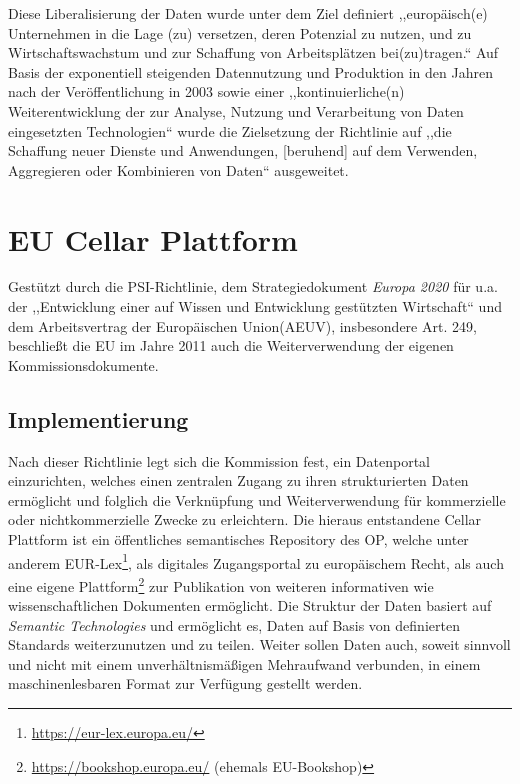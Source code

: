     \medskip
    Diese Liberalisierung der Daten wurde unter dem Ziel definiert ,,europäisch(e) Unternehmen in die Lage (zu) versetzen, deren Potenzial zu nutzen, und zu Wirtschaftswachstum und zur Schaffung von Arbeitsplätzen bei(zu)tragen.``\cite[ErwG. 5]{2003L0098} 
    Auf Basis der exponentiell steigenden Datennutzung und Produktion in den Jahren nach der Veröffentlichung in 2003 sowie einer ,,kontinuierliche(n) Weiterentwicklung der zur Analyse, Nutzung und Verarbeitung von Daten eingesetzten Technologien``\cite[ErwG. 5]{2013L0037} wurde die Zielsetzung der Richtlinie auf ,,die Schaffung neuer Dienste und Anwendungen, [beruhend] auf dem Verwenden, Aggregieren oder Kombinieren von Daten``\cite[ErwG. 5]{2013L0037} ausgeweitet. 
    
\pagebreak
\section{EU Cellar Plattform}

    Gestützt durch die PSI-Richtlinie, dem Strategiedokument \textit{Europa 2020} für u.a. der ,,Entwicklung einer auf Wissen und Entwicklung gestützten Wirtschaft`` und dem Arbeitsvertrag der Europäischen Union(AEUV), insbesondere Art. 249, beschließt die EU im Jahre 2011 auch die Weiterverwendung der eigenen Kommissionsdokumente. \cite[ErwG. 1]{2011D0833}
    
\subsection{Implementierung}

    Nach dieser Richtlinie legt sich die Kommission fest, ein Datenportal einzurichten, welches einen zentralen Zugang zu ihren strukturierten Daten ermöglicht und folglich die Verknüpfung und Weiterverwendung für kommerzielle oder nichtkommerzielle Zwecke zu erleichtern. \cite[Art. 5]{2011D0833}
    Die hieraus entstandene Cellar Plattform ist ein öffentliches semantisches Repository des \ac{OP}, welche unter anderem EUR-Lex\footnote{\href{https://eur-lex.europa.eu/homepage.html?locale=de}{https://eur-lex.europa.eu/}}, als digitales Zugangsportal zu europäischem Recht, als auch eine eigene Plattform\footnote{\href{https://bookshop.europa.eu/}{https://bookshop.europa.eu/} (ehemals EU-Bookshop)} zur Publikation von weiteren informativen wie wissenschaftlichen Dokumenten ermöglicht.
    Die Struktur der Daten basiert auf \textit{Semantic Technologies} und ermöglicht es, Daten auf Basis von definierten Standards weiterzunutzen und zu teilen. \cite[5]{eu_cellar}
    Weiter sollen Daten auch, soweit sinnvoll und nicht mit einem unverhältnismäßigen Mehraufwand verbunden, in einem maschinenlesbaren Format zur Verfügung gestellt werden. \cite[Art. 8 Abs. 1f]{2011D0833}


